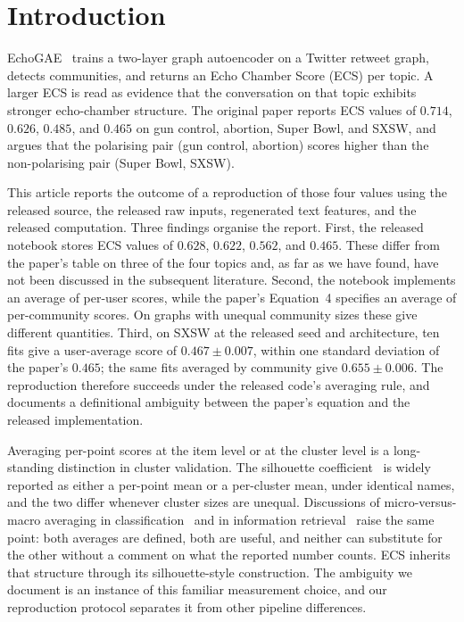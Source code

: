 \section{Introduction}

EchoGAE~\supercite{Alatawi2023EchoGAE} trains a two-layer graph autoencoder on a Twitter retweet graph, detects communities, and returns an Echo Chamber Score (ECS) per topic. A larger ECS is read as evidence that the conversation on that topic exhibits stronger echo-chamber structure. The original paper reports ECS values of $0.714$, $0.626$, $0.485$, and $0.465$ on gun control, abortion, Super Bowl, and SXSW, and argues that the polarising pair (gun control, abortion) scores higher than the non-polarising pair (Super Bowl, SXSW).

This article reports the outcome of a reproduction of those four values using the released source, the released raw inputs, regenerated text features, and the released computation. Three findings organise the report. First, the released notebook stores ECS values of $0.628$, $0.622$, $0.562$, and $0.465$. These differ from the paper's table on three of the four topics and, as far as we have found, have not been discussed in the subsequent literature. Second, the notebook implements an average of per-user scores, while the paper's Equation~4 specifies an average of per-community scores. On graphs with unequal community sizes these give different quantities. Third, on SXSW at the released seed and architecture, ten fits give a user-average score of $0.467 \pm 0.007$, within one standard deviation of the paper's $0.465$; the same fits averaged by community give $0.655 \pm 0.006$. The reproduction therefore succeeds under the released code's averaging rule, and documents a definitional ambiguity between the paper's equation and the released implementation.

Averaging per-point scores at the item level or at the cluster level is a long-standing distinction in cluster validation. The silhouette coefficient~\supercite{Rousseeuw1987} is widely reported as either a per-point mean or a per-cluster mean, under identical names, and the two differ whenever cluster sizes are unequal. Discussions of micro-versus-macro averaging in classification~\supercite{YangLiu1999} and in information retrieval~\supercite{Manning2008IR} raise the same point: both averages are defined, both are useful, and neither can substitute for the other without a comment on what the reported number counts. ECS inherits that structure through its silhouette-style construction. The ambiguity we document is an instance of this familiar measurement choice, and our reproduction protocol separates it from other pipeline differences.

